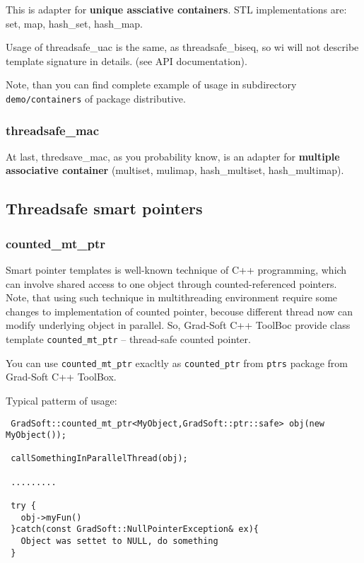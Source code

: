 \documentclass[10pt]{article}
\begin{document}
 This is adapter for {\bf unique assciative containers}. STL implementations
 are:
 set, map, hash\_set, hash\_map. 

 Usage of threadsafe\_uac is the same, as threadsafe\_biseq, so
 wi will not describe template signature in details. (see API documentation).

 Note, than you can find complete example of usage in subdirectory 
 \verb|demo/containers| of package distributive.

\subsubsection{ threadsafe\_mac }

 At last, thredsave\_mac, as you probability know, is an adapter for
  {\bf multiple associative container} 
 (multiset, mulimap, hash\_multiset, hash\_multimap).

\subsection{ Threadsafe smart pointers }

\subsubsection{ counted\_mt\_ptr }

 Smart pointer templates is well-known technique of C++ programming, which
can involve shared access to one object through counted-referenced pointers.
Note, that using such technique in multithreading environment require some
changes to implementation of counted pointer, becouse different thread now
can modify underlying object in parallel. So, Grad-Soft C++ ToolBoc provide
class template \verb|counted_mt_ptr| -- thread-safe counted pointer.
 
You can use \verb|counted_mt_ptr| exacltly as \verb|counted_ptr| from 
\verb|ptrs| package from Grad-Soft C++ ToolBox.

 Typical patterm of usage:

\begin{verbatim}
 GradSoft::counted_mt_ptr<MyObject,GradSoft::ptr::safe> obj(new MyObject());

 callSomethingInParallelThread(obj);
 
 .........

 try {
   obj->myFun()
 }catch(const GradSoft::NullPointerException& ex){
   Object was settet to NULL, do something 
 }

\end{verbatim}
\end{document}
